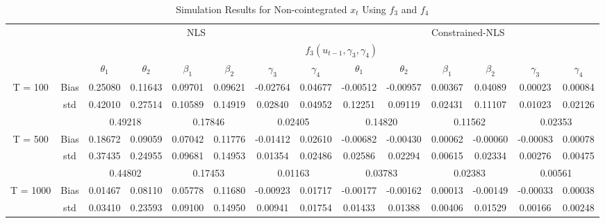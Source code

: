 \documentclass[a4paper,12pt,times,numbered,print,index]{report}
\numberwithin{equation}{section}
\begin{document}
\begin{table}[htbp]
	\centering
	\caption{Simulation Results for Non-cointegrated $x_t$ Using $f_3$ and $f_4$}
	\begin{adjustbox}{max width=\textwidth}
	\begin{tabular}{cccccccccccccc}
		\toprule
		& \multicolumn{7}{c}{NLS}                               & \multicolumn{6}{c}{Constrained-NLS} \\
		&       & \multicolumn{12}{c}{$f_3 (u_{t-1}, \gamma_3, \gamma_4)$} \\
		&       & $\theta_1$ & $\theta_2$ & $\beta_1$ & $\beta_2$ & $\gamma_3$ & $\gamma_{4}$ & $\theta_1$ & $\theta_2$ & $\beta_1$ & $\beta_2$ & $\gamma_3$ & $\gamma_{4}$ \\
		\midrule
		\multirow{3}[1]{*}{T = 100} & Bias  & \textcolor[rgb]{ 0,  .439,  .753}{0.25080} & 0.11643 & 0.09701 & 0.09621 & -0.02764 & 0.04677 & \textcolor[rgb]{ 0,  .439,  .753}{-0.00512} & -0.00957 & 0.00367 & 0.04089 & 0.00023 & 0.00084 \\
		& std   & 0.42010 & 0.27514 & 0.10589 & 0.14919 & 0.02840 & 0.04952 & 0.12251 & 0.09119 & 0.02431 & 0.11107 & 0.01023 & 0.02126 \\
		&       & \multicolumn{2}{c}{0.49218} & \multicolumn{2}{c}{0.17846} & \multicolumn{2}{c}{0.02405} & \multicolumn{2}{c}{0.14820} & \multicolumn{2}{c}{0.11562} & \multicolumn{2}{c}{0.02353} \\
		\multirow{3}[0]{*}{T = 500} & Bias  & \textcolor[rgb]{ 0,  .439,  .753}{0.18672} & 0.09059 & 0.07042 & 0.11776 & -0.01412 & 0.02610 & \textcolor[rgb]{ 0,  .439,  .753}{-0.00682} & -0.00430 & 0.00062 & -0.00060 & -0.00083 & 0.00078 \\
		& std   & 0.37435 & 0.24955 & 0.09681 & 0.14953 & 0.01354 & 0.02486 & 0.02586 & 0.02294 & 0.00615 & 0.02334 & 0.00276 & 0.00475 \\
		&       & \multicolumn{2}{c}{0.44802} & \multicolumn{2}{c}{0.17453} & \multicolumn{2}{c}{0.01163} & \multicolumn{2}{c}{0.03783} & \multicolumn{2}{c}{0.02383} & \multicolumn{2}{c}{0.00561} \\
		\multirow{3}[1]{*}{T = 1000} & Bias  & \textcolor[rgb]{ 0,  .439,  .753}{0.01467} & 0.08110 & 0.05778 & 0.11680 & -0.00923 & 0.01717 & \textcolor[rgb]{ 0,  .439,  .753}{-0.00177} & -0.00162 & 0.00013 & -0.00149 & -0.00033 & 0.00038 \\
		& std   & 0.03410 & 0.23593 & 0.09100 & 0.14950 & 0.00941 & 0.01754 & 0.01433 & 0.01388 & 0.00406 & 0.01529 & 0.00166 & 0.00248 \\

\end{tabular}
\end{adjustbox}
\end{table}
\end{document}
